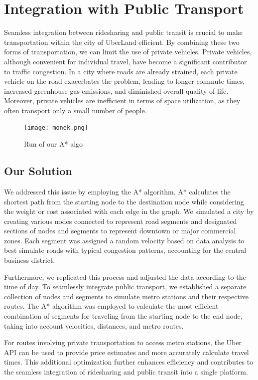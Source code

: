 \documentclass{article}
\begin{document}
\section{Integration with Public Transport}
Seamless integration between ridesharing and public transit is crucial to make transportation within the city of UberLand efficient. By combining these two forms of transportation, we can limit the use of private vehicles. Private vehicles, although convenient for individual travel, have become a significant contributor to traffic congestion. In a city where roads are already strained, each private vehicle on the road exacerbates the problem, leading to longer commute times, increased greenhouse gas emissions, and diminished overall quality of life. Moreover, private vehicles are inefficient in terms of space utilization, as they often transport only a small number of people. 

\begin{figure}[h]
    \centering
    \texttt{[image: monek.png]}
    \caption{Run of our A* algo}
    \end{figure}


\subsection {Our Solution}
We addressed this issue by employing the A* algorithm. A* calculates the shortest path from the starting node to the destination node while considering the weight or cost associated with each edge in the graph. We simulated a city by creating various nodes connected to represent road segments and designated sections of nodes and segments to represent downtown or major commercial zones. Each segment was assigned a random velocity based on data analysis to best simulate roads with typical congestion patterns, accounting for the central business district.

Furthermore, we replicated this process and adjusted the data according to the time of day. To seamlessly integrate public transport, we established a separate collection of nodes and segments to simulate metro stations and their respective routes. The A* algorithm was employed to calculate the most efficient combination of segments for traveling from the starting node to the end node, taking into account velocities, distances, and metro routes.

For routes involving private transportation to access metro stations, the Uber API can be used to provide price estimates and more accurately calculate travel times. This additional optimization further enhances efficiency and contributes to the seamless integration of ridesharing and public transit into a single platform.
\end{document}
